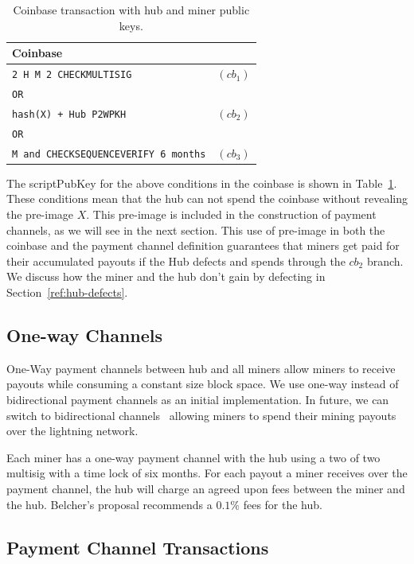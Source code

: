 \documentclass{article}
\begin{document}
\begin{table}
  \centering
  \begin{tabular}{ lr }
    \bfseries Coinbase \\
    \midrule
    \verb|2 H M 2 CHECKMULTISIG| & $(cb_1)$ \\
    \verb|OR| \\
    \verb|hash(X) + Hub P2WPKH| & $(cb_2)$ \\
    \verb|OR| \\
    \verb|M and CHECKSEQUENCEVERIFY 6 months| & $(cb_3)$\\ 
    \midrule
  \end{tabular}
  \caption{Coinbase transaction with hub and miner public keys.}\label{table:coinbase}
\end{table}

The scriptPubKey for the above conditions in the coinbase is shown in
Table~\ref{table:coinbase}. These conditions mean that the hub can not
spend the coinbase without revealing the pre-image $X$. This pre-image
is included in the construction of payment channels, as we will see in
the next section. This use of pre-image in both the coinbase and the
payment channel definition guarantees that miners get paid for their
accumulated payouts if the Hub defects and spends through the $cb_2$
branch. We discuss how the miner and the hub don't gain by defecting
in Section~\ref{ref:hub-defects}.

\subsection{One-way Channels}

One-Way payment channels between hub and all miners allow miners to
receive payouts while consuming a constant size block space. We use
one-way instead of bidirectional payment channels as an initial
implementation. In future, we can switch to bidirectional
channels~\cite{poon2016bitcoin} allowing miners to spend their mining
payouts over the lightning network.

Each miner has a one-way payment channel with the hub using a two of
two multisig with a time lock of six months. For each payout a miner
receives over the payment channel, the hub will charge an agreed upon
fees between the miner and the hub. Belcher's proposal recommends a
$0.1\%$ fees for the hub.

\subsection{Payment Channel Transactions}
\end{document}
